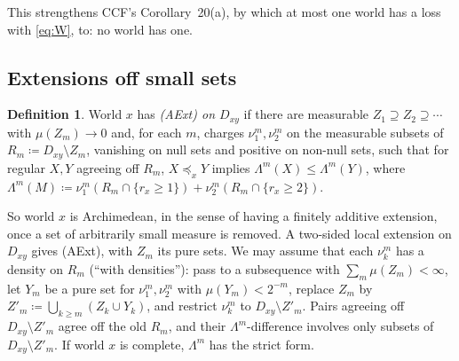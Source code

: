 \documentclass[11pt]{article}
\theoremstyle{definition}\newtheorem{definition}[theorem]{Definition}
\theoremstyle{remark}\newtheorem{remark}[theorem]{Remark}
\begin{document}
\noindent This strengthens CCF's Corollary~20(a), by which at most one world
has a loss with \eqref{eq:W}, to: no world has one.

\subsection{Extensions off small sets}

\begin{definition}\label{def:aext}
World $x$ has \emph{(AExt) on $D_{xy}$} if there are measurable
$Z_1\supseteq Z_2\supseteq\cdots$ with $\mu(Z_m)\to0$ and, for each $m$,
charges $\nu^m_1,\nu^m_2$ on the measurable subsets of
$R_m\coloneqq D_{xy}\setminus Z_m$, vanishing on null sets and
positive on non-null sets, such that for
regular $X,Y$ agreeing off $R_m$, $X\preceq_xY$ implies
$\Lambda^m(X)\le\Lambda^m(Y)$, where $\Lambda^m(M)\coloneqq
\nu^m_1(R_m\cap\{r_x\ge1\})+\nu^m_2(R_m\cap\{r_x\ge2\})$.
\end{definition}

So world $x$ is Archimedean, in the sense of having a finitely additive
extension, once a set of arbitrarily small measure is removed. A
two-sided local extension on $D_{xy}$ gives (AExt), with $Z_m$ its pure sets.
We may assume that each $\nu^m_k$ has a density on $R_m$ (``with
densities''): pass to a subsequence with $\sum_m\mu(Z_m)<\infty$, let $Y_m$
be a pure set for $\nu^m_1,\nu^m_2$ with $\mu(Y_m)<2^{-m}$, replace $Z_m$ by
$Z'_m\coloneqq\bigcup_{k\ge m}(Z_k\cup Y_k)$, and restrict $\nu^m_k$ to
$D_{xy}\setminus Z'_m$. Pairs agreeing off $D_{xy}\setminus Z'_m$ agree off
the old $R_m$, and their $\Lambda^m$-difference involves only subsets of
$D_{xy}\setminus Z'_m$. If world $x$ is complete, $\Lambda^m$ has the strict
form.
\end{document}
